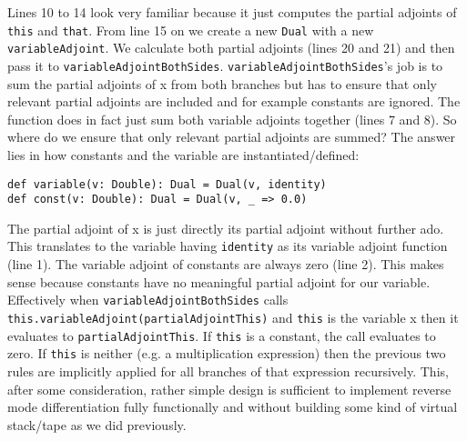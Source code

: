 Lines 10 to 14 look very familiar because it just computes the partial adjoints of \lstinline{this} and \lstinline{that}. From line 15 on we create a new \lstinline{Dual} with a new \lstinline{variableAdjoint}.  We calculate both partial adjoints (lines 20 and 21) and then pass it to \lstinline{variableAdjointBothSides}. \lstinline{variableAdjointBothSides}'s job is to sum the partial adjoints of x from both branches but has to ensure that only relevant partial adjoints are included and for example constants are ignored. The function does in fact just sum both variable adjoints together (lines 7 and 8). So where do we ensure that only relevant partial adjoints are summed? The answer lies in how constants and the variable are instantiated/defined:
\begin{lstlisting}
def variable(v: Double): Dual = Dual(v, identity)
def const(v: Double): Dual = Dual(v, _ => 0.0)
\end{lstlisting}
The partial adjoint of x is just directly its partial adjoint without further ado. This translates to the variable having \lstinline{identity} as its variable adjoint function (line 1). The variable adjoint of constants are always zero (line 2). This makes sense because constants have no meaningful partial adjoint for our variable. Effectively when \lstinline{variableAdjointBothSides} calls \lstinline{this.variableAdjoint(partialAdjointThis)} and \lstinline{this} is the variable x then it evaluates to \lstinline{partialAdjointThis}. If \lstinline{this} is a constant, the call evaluates to zero. If \lstinline{this} is neither (e.g. a multiplication expression) then the previous two rules are implicitly applied for all branches of that expression recursively. This, after some consideration, rather simple design is sufficient to implement reverse mode differentiation fully functionally and without building some kind of virtual stack/tape as we did previously.

